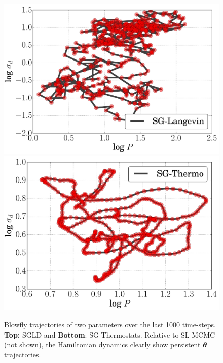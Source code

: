 \documentclass[]{article}
\begin{document}
\begin{figure}[t]
\vskip 0.2in
\begin{center}
\includegraphics[width=0.75\columnwidth]{./images/blowfly/non-sticky-theta-2d-SG-Langevin.pdf}
\includegraphics[width=0.75\columnwidth]{./images/blowfly/non-sticky-theta-2d-SG-Thermo.pdf}
\vspace{-0.15in}
\caption{\small{Blowfly trajectories of two parameters over the last 1000 time-steps.  {\bf Top:} SGLD and {\bf Bottom}: SG-Thermostats.  Relative to SL-MCMC (not shown), the Hamiltonian dynamics clearly show persistent ${\bm \theta}$ trajectories.}}
\label{fig:bf-two-d-theta}
\end{center}
\vspace{-0.1in}
\end{figure}

\vspace{-0.1in}
\end{document}
